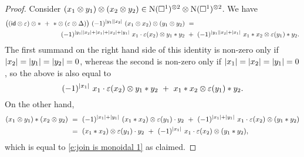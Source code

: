 \begin{proof}
	Consider $(x_1 \otimes y_1) \otimes (x_2 \otimes y_2) \in \operatorname{N}(\square^1)^{\otimes 2} \otimes \operatorname{N}(\square^1)^{\otimes 2}$.
	We have
	\[
	\begin{split}
	\big((\mathsf{id} \otimes \varepsilon) \otimes \ast \ + \ \ast \otimes (\varepsilon \otimes \Delta)\big) \ (-1)^{\lvert y_1\rvert \lvert x_2\rvert} \ (x_1 \otimes x_2) \otimes (y_1 \otimes y_2) \ & = \\
	(-1)^{\lvert y_1\rvert \lvert x_2\rvert + \lvert x_1\rvert + \lvert x_2\rvert + \lvert y_1\rvert} \ x_1 \cdot \varepsilon(x_2) \otimes y_1 \ast y_2 \ & + \
	(-1)^{\lvert y_1\rvert \lvert x_2\rvert + \lvert x_1\rvert} \ x_1 \ast x_2 \otimes \varepsilon(y_1) \ast y_2.
	\end{split}
	\]
	The first summand on the right hand side of this identity is non-zero only if $\lvert x_2\rvert = \lvert y_1\rvert = \lvert y_2\rvert = 0$, whereas the second is non-zero only if $\lvert x_1\rvert = \lvert x_2\rvert = \lvert y_1\rvert = 0$, so the above is also equal to
	\begin{equation} \label{e:join is monoidal 1}
	(-1)^{\lvert x_1\rvert} \ x_1 \cdot \varepsilon(x_2) \otimes y_1 \ast y_2 \ + \
	x_1 \ast x_2 \otimes \varepsilon(y_1) \ast y_2.
	\end{equation}
	On the other hand,
	\begin{align*}
	(x_1 \otimes y_1) \ast (x_2 \otimes y_2) \ & =\
	(-1)^{\lvert x_1\rvert + \lvert y_1\rvert} \ (x_1 \ast x_2) \otimes \varepsilon(y_1) \cdot y_2 \ +\
	(-1)^{\lvert x_1\rvert + \lvert y_1\rvert} \ x_1 \cdot \varepsilon(x_2) \otimes (y_1 \ast y_2) \\ \ & =\
	(x_1 \ast x_2) \otimes \varepsilon(y_1) \cdot y_2 \ +\
	(-1)^{\lvert x_1\rvert} \ x_1 \cdot \varepsilon(x_2) \otimes (y_1 \ast y_2),
	\end{align*}
	which is equal to \eqref{e:join is monoidal 1} as claimed.
\end{proof}

